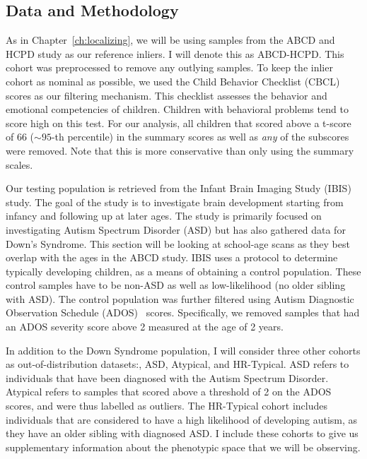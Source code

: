 \subsection*{Data and Methodology}
 
As in Chapter~\ref{ch:localizing}, we will be using samples from the ABCD and HCPD study as our reference inliers. I will denote this as ABCD-HCPD. This cohort was preprocessed to remove any outlying samples. To keep the inlier cohort as nominal as possible, we used the Child Behavior Checklist (CBCL)~\cite{achenbachChildBehaviorChecklist1999} scores as our filtering mechanism. This checklist assesses the behavior and emotional competencies of children. Children with behavioral problems tend to score high on this test. For our analysis, all children that scored above a t-score of 66 ($\sim 95$-th percentile) in the summary scores as well as \textit{any} of the subscores were removed. Note that this is more conservative than only using the summary scales.

Our testing population is retrieved from the Infant Brain Imaging Study (IBIS) study. The goal of the study is to investigate brain development starting from infancy and following up at later ages. The study is primarily focused on investigating Autism Spectrum Disorder (ASD) but has also gathered data for Down's Syndrome. This section will be looking at school-age scans as they best overlap with the ages in the ABCD study. IBIS uses a protocol to determine typically developing children, as a means of obtaining a control population. These control samples have to be non-ASD as well as low-likelihood (no older sibling with ASD). The control population was further filtered using Autism Diagnostic Observation Schedule (ADOS)~\cite{lord2012autism} scores. Specifically, we removed samples that had an ADOS severity score above 2 measured at the age of 2 years.

In addition to the Down Syndrome population, I will consider three other cohorts as out-of-distribution datasets:, ASD, Atypical, and HR-Typical. ASD refers to individuals that have been diagnosed with the Autism Spectrum Disorder. Atypical refers to samples that scored above a threshold of 2 on the ADOS scores, and were thus labelled as outliers. The HR-Typical cohort includes individuals that are considered to have a high likelihood of developing autism, as they have an older sibling with diagnosed ASD. I include these cohorts to give us supplementary information about the phenotypic space that we will be observing.


